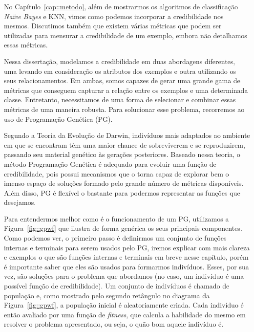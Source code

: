 
No Capítulo~\ref{cap::metodo},
além de mostrarmos os algoritmos de classificação \textit{Naïve Bayes} e \textsc{KNN}, vimos como podemos incorporar a credibilidade nos mesmos.
Discutimos também que existem várias métricas que podem ser utilizadas para mensurar a credibilidade de um exemplo, 
embora não detalhamos essas métricas.

Nessa dissertação, modelamos a credibilidade em duas abordagens diferentes, uma levando em consideração os atributos dos exemplos e outra utilizando os seus relacionamentos. 
Em ambas, somos capazes de gerar uma grande gama de métricas que conseguem capturar a relação entre os exemplos e uma determinada classe.
Entretanto, necessitamos de uma forma de selecionar e combinar essas métricas de uma maneira robusta. Para solucionar esse problema, recorremos ao uso de Programação Genética (\textsc{PG}).

Segundo a Teoria da Evolução de Darwin, indivíduos mais adaptados ao ambiente em que se encontram têm uma maior chance de sobreviverem e se reproduzirem, passando seu material genético às gerações posteriores. Baseado nessa teoria, o método Programação Genética é adequado para evoluir uma função de credibilidade, pois possui mecanismos que o torna capaz de explorar bem o imenso espaço de soluções formado pelo grande número de métricas disponíveis. Além disso, \textsc{PG} é flexível o bastante para podermos representar as funções que desejamos.

Para entendermos melhor como é o funcionamento de um \textsc{PG}, utilizamos a Figura~\ref{fig::gpwf} que ilustra de forma genérica os seus principais componentes.
Como podemos ver, o primeiro passo é definirmos um conjunto de funções internas e terminais para serem usados pelo \textsc{PG}, iremos explicar com mais clareza e exemplos o que são funções internas e terminais em breve nesse capítulo, porém é importante saber que eles são usados para formarmos indivíduos. 
Esses, por sua vez, são soluções para o problema que abordamos (no caso, um indivíduo é uma possível função de credibilidade).
Um conjunto de indivíduos é chamado de população e, como mostrado pelo segundo retângulo no diagrama da Figura~\ref{fig::gpwf}, a população inicial é aleatoriamente criada. 
Cada indivíduo é então avaliado por uma função de \textit{fitness}, que calcula a habilidade do mesmo em resolver o problema apresentado, ou seja, o quão bom aquele indivíduo é.

